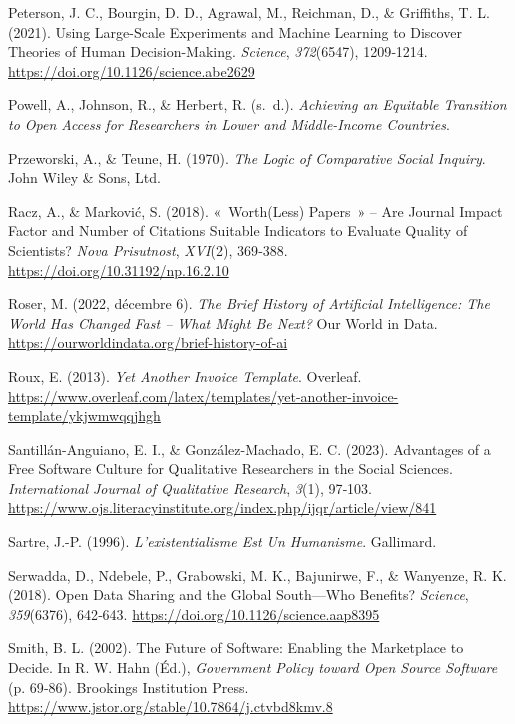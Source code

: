 \documentclass[
  letterpaper,
  DIV=11,
  numbers=noendperiod]{scrreprt}
\newlength{\cslhangindent}
\newenvironment{CSLReferences}[2] %
 {\begin{list}{}{%
  \setlength{\itemindent}{0pt}
  \setlength{\leftmargin}{0pt}
  \setlength{\parsep}{0pt}
  \ifodd #1
   \setlength{\leftmargin}{\cslhangindent}
   \setlength{\itemindent}{-1\cslhangindent}
  \fi
  \setlength{\itemsep}{#2\baselineskip}}}
 {\end{list}}
\begin{document}
\begin{CSLReferences}{1}{0}
Peterson, J. C., Bourgin, D. D., Agrawal, M., Reichman, D., \&
Griffiths, T. L. (2021). Using {Large-Scale Experiments} and {Machine
Learning} to {Discover Theories} of {Human Decision-Making}.
\emph{Science}, \emph{372}(6547), 1209‑1214.
\url{https://doi.org/10.1126/science.abe2629}

Powell, A., Johnson, R., \& Herbert, R. (s.~d.). \emph{Achieving an
{Equitable Transition} to {Open Access} for {Researchers} in {Lower} and
{Middle-Income Countries}}.

Przeworski, A., \& Teune, H. (1970). \emph{The Logic of Comparative
Social Inquiry}. John Wiley \& Sons, Ltd.

Racz, A., \& Marković, S. (2018). {«~{Worth}(Less) Papers~»} -- Are
Journal Impact Factor and Number of Citations Suitable Indicators to
Evaluate Quality of Scientists? \emph{Nova Prisutnost}, \emph{XVI}(2),
369‑388. \url{https://doi.org/10.31192/np.16.2.10}

Roser, M. (2022, décembre 6). \emph{The {Brief History} of {Artificial
Intelligence}: {The World Has Changed Fast} -- {What Might Be Next}?}
Our World in Data. \url{https://ourworldindata.org/brief-history-of-ai}

Roux, E. (2013). \emph{Yet {Another Invoice Template}}. Overleaf.
\url{https://www.overleaf.com/latex/templates/yet-another-invoice-template/ykjwmwqqjhgh}

Santillán-Anguiano, E. I., \& González-Machado, E. C. (2023). Advantages
of a {Free Software Culture} for {Qualitative Researchers} in the
{Social Sciences}. \emph{International Journal of Qualitative Research},
\emph{3}(1), 97‑103.
\url{https://www.ojs.literacyinstitute.org/index.php/ijqr/article/view/841}

Sartre, J.-P. (1996). \emph{L'existentialisme Est Un Humanisme}.
Gallimard.

Serwadda, D., Ndebele, P., Grabowski, M. K., Bajunirwe, F., \& Wanyenze,
R. K. (2018). Open Data Sharing and the {Global South}---{Who} Benefits?
\emph{Science}, \emph{359}(6376), 642‑643.
\url{https://doi.org/10.1126/science.aap8395}

Smith, B. L. (2002). The {Future} of {Software}: {Enabling} the
{Marketplace} to {Decide}. In R. W. Hahn (Éd.), \emph{Government
{Policy} toward {Open Source Software}} (p. 69‑86). Brookings
Institution Press.
\url{https://www.jstor.org/stable/10.7864/j.ctvbd8kmv.8}


\end{CSLReferences}
\end{document}
